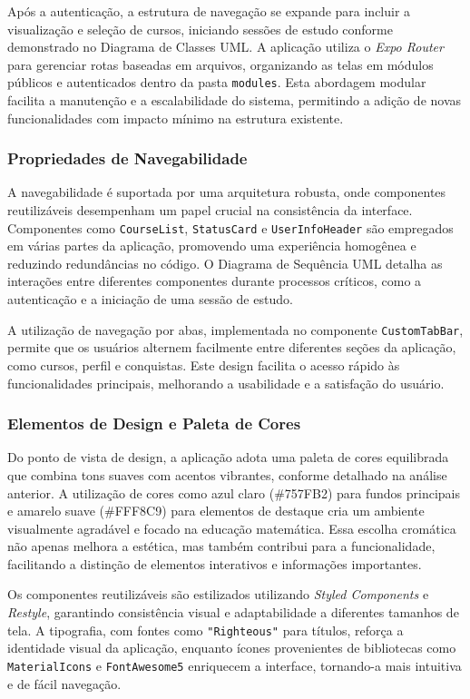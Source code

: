Após a autenticação, a estrutura de navegação se expande para incluir a visualização e seleção de cursos, iniciando sessões de estudo conforme demonstrado no Diagrama de Classes UML. A aplicação utiliza o \textit{Expo Router} para gerenciar rotas baseadas em arquivos, organizando as telas em módulos públicos e autenticados dentro da pasta \texttt{modules}. Esta abordagem modular facilita a manutenção e a escalabilidade do sistema, permitindo a adição de novas funcionalidades com impacto mínimo na estrutura existente.

\subsubsection{Propriedades de Navegabilidade}

A navegabilidade é suportada por uma arquitetura robusta, onde componentes reutilizáveis desempenham um papel crucial na consistência da interface. Componentes como \texttt{CourseList}, \texttt{StatusCard} e \texttt{UserInfoHeader} são empregados em várias partes da aplicação, promovendo uma experiência homogênea e reduzindo redundâncias no código. O Diagrama de Sequência UML detalha as interações entre diferentes componentes durante processos críticos, como a autenticação e a iniciação de uma sessão de estudo.

A utilização de navegação por abas, implementada no componente \texttt{CustomTabBar}, permite que os usuários alternem facilmente entre diferentes seções da aplicação, como cursos, perfil e conquistas. Este design facilita o acesso rápido às funcionalidades principais, melhorando a usabilidade e a satisfação do usuário.

\subsubsection{Elementos de Design e Paleta de Cores}

Do ponto de vista de design, a aplicação adota uma paleta de cores equilibrada que combina tons suaves com acentos vibrantes, conforme detalhado na análise anterior. A utilização de cores como azul claro (\#757FB2) para fundos principais e amarelo suave (\#FFF8C9) para elementos de destaque cria um ambiente visualmente agradável e focado na educação matemática. Essa escolha cromática não apenas melhora a estética, mas também contribui para a funcionalidade, facilitando a distinção de elementos interativos e informações importantes.

Os componentes reutilizáveis são estilizados utilizando \textit{Styled Components} e \textit{Restyle}, garantindo consistência visual e adaptabilidade a diferentes tamanhos de tela. A tipografia, com fontes como \texttt{"Righteous"} para títulos, reforça a identidade visual da aplicação, enquanto ícones provenientes de bibliotecas como \texttt{MaterialIcons} e \texttt{FontAwesome5} enriquecem a interface, tornando-a mais intuitiva e de fácil navegação.

